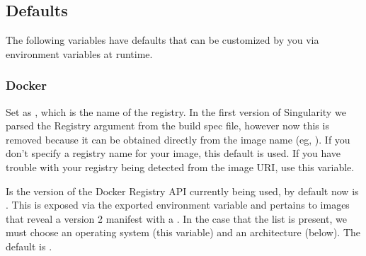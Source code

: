 \documentclass[letterpaper,10pt,english]{sphinxmanual}
\begin{document}
%
\begin{sphinxVerbatim}[commandchars=\\\{\}]
     


   \PYG{p}{[}\PYG{p}{]}                                        
\end{sphinxVerbatim}


\subsection{Defaults}
\label{\detokenize{build_environment:defaults}}
The following variables have defaults that can be customized by you via
environment variables at runtime.


\subsubsection{Docker}
\label{\detokenize{build_environment:docker}}
 Set as , which is the name of the registry. In
the first version of Singularity we parsed the Registry argument from
the build spec file, however now this is removed because it can be
obtained directly from the image name (eg, ). If you don’t specify a
registry name for your image, this default is used. If you have
trouble with your registry being detected from the image URI, use this
variable.

 Is the version of the Docker Registry API
currently being used, by default now is .
 This is exposed via the exported environment variable 
and pertains to images that reveal a version 2 manifest with a
. In the case that the list is present, we must choose
an operating system (this variable) and an architecture (below). The
default is .
\end{document}
